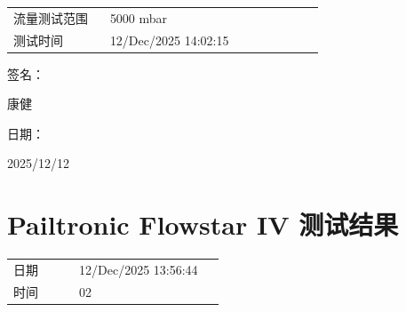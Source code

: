 \documentclass[UTF8,10pt,a4paper,fontset=fandol]{ctexart}
\newcommand{\fieldvalue}[1]{#1}
\newcommand{\handwritten}[1]{#1}
\begin{document}
\vspace{1em}

\begin{tabular}{@{}p{0.28\linewidth}p{0.62\linewidth}@{}}
流量测试范围 &
\fieldvalue{5000 mbar}
\\
测试时间 &
\fieldvalue{12/Dec/2025 14:02:15}
\\
\end{tabular}

\vspace{1em}

签名：

\fieldvalue{\handwritten{康健}}

日期：

\fieldvalue{\handwritten{2025/12/12}}


\section{Pailtronic Flowstar IV 测试结果}

\begin{tabular}{@{}p{0.28\linewidth}p{0.62\linewidth}@{}}
日期 &
\fieldvalue{12/Dec/2025 13:56:44}
\\
时间 &
\fieldvalue{02}
\\
\end{tabular}

\vspace{1em}

\begin{center}
\end{center}

\vspace{1em}
\end{document}
